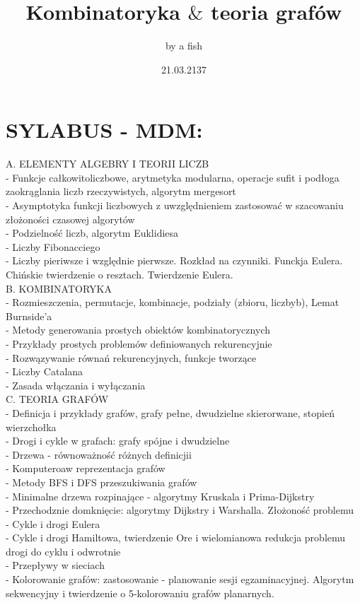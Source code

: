 \documentclass{article}[13pt]
\title {Kombinatoryka $\&$ teoria grafów}
\author{by a fish}
\date {21.03.2137}
\begin{document}
\maketitle

\newpage

\section*{SYLABUS - MDM:}
\indent A. ELEMENTY ALGEBRY I TEORII LICZB\medskip\\
\indent\indent - Funkcje całkowitoliczbowe, arytmetyka modularna, operacje sufit i podłoga zaokrąglania liczb rzeczywistych, algorytm mergesort\\
\indent\indent - Asymptotyka funkcji liczbowych z uwzględnieniem zastosować w szacowaniu złożoności czasowej algorytów\\
\indent\indent - Podzielność liczb, algorytm Euklidiesa\\
\indent\indent - Liczby Fibonacciego\\
\indent\indent - Liczby pieriwsze i względnie pierwsze. Rozkład na czynniki. Funckja Eulera. Chińskie twierdzenie o resztach. Twierdzenie Eulera.\bigskip\\
\indent B. KOMBINATORYKA\medskip\\
\indent\indent - Rozmieszczenia, permutacje, kombinacje, podziały (zbioru, liczbyb), Lemat Burnside'a\\
\indent\indent - Metody generowania prostych obiektów kombinatorycznych\\
\indent\indent - Przykłady prostych problemów definiowanych rekurencyjnie\\
\indent\indent - Rozwązywanie równań rekurencyjnych, funkcje tworzące\\
\indent\indent - Liczby Catalana\\
\indent\indent - Zasada włączania i wyłączania\bigskip\\
\indent C. TEORIA GRAFÓW\medskip\\
\indent\indent - Definicja i przykłady grafów, grafy pełne, dwudzielne skierorwane, stopień wierzchołka\\
\indent\indent - Drogi i cykle w grafach: grafy spójne i dwudzielne\\
\indent\indent - Drzewa - równoważność różnych definicjii\\
\indent\indent - Komputeroaw reprezentacja grafów\\
\indent\indent - Metody BFS i DFS przeszukiwania grafów\\
\indent\indent - Minimalne drzewa rozpinające - algorytmy Kruskala i Prima-Dijkstry\\
\indent\indent - Przechodznie domknięcie: algorytmy Dijkstry i Warshalla. Złożoność problemu\\
\indent\indent - Cykle i drogi Eulera\\
\indent\indent - Cykle i drogi Hamiltowa, twierdzenie Ore i wielomianowa redukcja problemu drogi do cyklu i odwrotnie\\
\indent\indent - Przepływy w sieciach\\
\indent\indent - Kolorowanie grafów: zastosowanie - planowanie sesji egzaminacyjnej. Algorytm sekwencyjny i twierdzenie o 5-kolorowaniu grafów planarnych.
\end{document}
